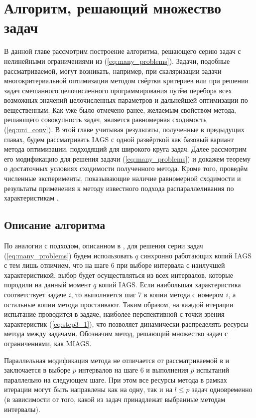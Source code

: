 \section{Алгоритм, решающий множество задач}

В данной главе рассмотрим построение алгоритма, решающего серию задач с нелинейными ограничениями из (\ref{eq:many_problems}).
Задачи, подобные рассматриваемой, могут возникать, например, при скаляризации задачи многокритериальной оптимизации
методом свёртки критериев или при решении задач смешанного целочисленного программирования \cite{gergelBarkalovMixedInteger2019}
путём перебора всех возможных значений целочисленных параметров и дальнейшей оптимизации по вещественным.
Как уже было отмечено ранее, желаемым свойством метода, решающего совокупность задач, является равномерная сходимость (\ref{eq:uni_conv}).
В этой главе учитывая результаты, полученные в предыдущих главах, будем рассматривать IAGS с одной развёрткой как
базовый вариант метода оптимизации, подходящий для широкого круга задач. Далее рассмотрим его модификацию для решения задачи (\ref{eq:many_problems})
и докажем теорему о достаточных условиях сходимости полученного метода. Кроме того, проведём численные эксперименты,
показывающие наличие равномерной сходимости и результаты применения к методу известного подхода распараллеливания по характеристикам \cite{Strongin2000}.

\subsection{Описание алгоритма}

По аналогии с подходом, описанном в \cite{BarkalovStrongin2018}, для решения серии задач (\ref{eq:many_problems}) будем
использовать \(q\) синхронно работающих копий IAGS с тем лишь отличием, что на шаге 6 при выборе
интервала с наилучшей характеристикой, выбор будет осуществляться из всех интервалов, которые
породили на данный момент \(q\) копий IAGS. Если наибольшая характеристика соответствует
задаче \(i\), то выполняется шаг 7 в копии метода с номером \(i\), а остальные копии метода простаивают.
Таким образом, на каждой итерации испытание проводится в задаче, наиболее перспективной с точки зрения
характеристик (\ref{eq:step3_1}), что позволяет динамически распределять ресурсы метода между задачами.
Обозначим метод, решающий множество задач с ограничениями, как MIAGS.

Параллельная модификация метода не отличается от рассматриваемой в \cite{BarkalovStrongin2018}
и заключается в выборе \(p\) интервалов на шаге 6 и выполнения \(p\) испытаний параллельно
на следующем шаге. При этом все ресурсы метода в рамках итерации могут быть направлены как на одну, так и
на \(l\leqslant p\) задач одновременно (в зависимости от того, какой из задач принадлежат выбранные методам интервалы).

